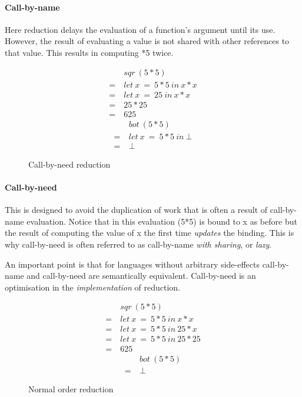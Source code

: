 \paragraph{Call-by-name} Here reduction delays the evaluation of a function's
argument until its use.  However, the result of evaluating a value is not
shared with other references to that value. This results in computing *5\>
twice.

\begin{figure}[!h]
\centering
\begin{multicols}{2}
\noindent
\begin{align*}
     &sqr\ (5*5) \\
  =\ &let\ x\ =\ 5 * 5\ in\ x * x \\
  =\ &let\ x\ =\ 25\ in\ x * x \\
  =\ &25 * 25 \\
  =\ &625
\end{align*}
\begin{align*}
     &bot\ (5*5) \\
  =\ &let\ x\ =\ 5*5\ in\ \bot \\
  =\ &\bot
\end{align*}
\end{multicols}
\caption{Call-by-need reduction}
\label{fig:call-by-need}
\end{figure}

\paragraph{Call-by-need} This is designed to avoid the duplication of work that
is often a result of call-by-name evaluation. Notice that in this evaluation
\<(5*5)\> is bound to \<x\> as before but the result of computing the value of
\<x\> the first time \emph{updates} the binding. This is why call-by-need is
often referred to as call-by-name \emph{with sharing}, or \emph{lazy}.

An important point is that for languages without arbitrary side-effects call-by-name
and call-by-need are semantically equivalent. Call-by-need is an optimisation in the
\emph{implementation} of reduction.


\begin{figure}[!h]
\centering
\begin{multicols}{2}
\noindent
\begin{align*}
     &sqr\ (5*5) \\
  =\ &let\ x\ =\ 5 * 5\ in\ x * x \\
  =\ &let\ x\ =\ 5 * 5\ in\ 25 * x \\
  =\ &let\ x\ =\ 5 * 5\ in\ 25 * 25 \\
  =\ &625
\end{align*}
\begin{align*}
     &bot\ (5*5) \\
  =\ &\bot
\end{align*}
\end{multicols}
\caption{Normal order reduction}
\label{fig:normal-order}
\end{figure}

